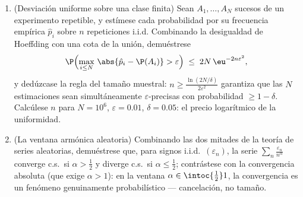 \begin{problem}
\begin{enumerate}[resume]
  \item (Desviación uniforme sobre una clase finita) Sean $A_1,
        \dots, A_N$ sucesos de un experimento repetible, y estímese cada
  probabilidad por su frecuencia empírica $\hat p_i$ sobre $n$
  repeticiones i.i.d. Combinando la desigualdad de Hoeffding con una
  cota de la unión, demuéstrese
        \[
        \P\Bigl(\max_{i\leq N}\,\abs{\hat p_i - \P(A_i)} >
        \varepsilon\Bigr) \;\leq\; 2N\,\eu^{-2n\varepsilon^2},
        \]
        y dedúzcase la regla del tamaño muestral: $n \geq
        \frac{\ln(2N/\delta)}{2\varepsilon^2}$ garantiza que las $N$
        estimaciones sean simultáneamente $\varepsilon$-precisas con
        probabilidad $\geq 1 -
        \delta$. Calcúlese $n$ para $N = 10^6$, $\varepsilon =
        0.01$, $\delta = 0.05$: el precio logarítmico de la uniformidad.
        \item (La ventana armónica aleatoria) Combinando las dos mitades
        de la teoría de series aleatorias, demuéstrese que, para signos
        i.i.d.\ $(\varepsilon_n)$, la serie
        $\sum_n\frac{\varepsilon_n}{n^\alpha}$ converge c.s.\ si
        $\alpha > \frac12$ y diverge c.s.\ si $\alpha \leq \frac12$;
        contrástese con la convergencia absoluta (que exige
        $\alpha > 1$): en la ventana $\alpha \in \intoc{\frac12}1$, la
        convergencia es un fenómeno genuinamente probabilístico ---
        cancelación, no tamaño.
\end{enumerate}
\end{problem}

